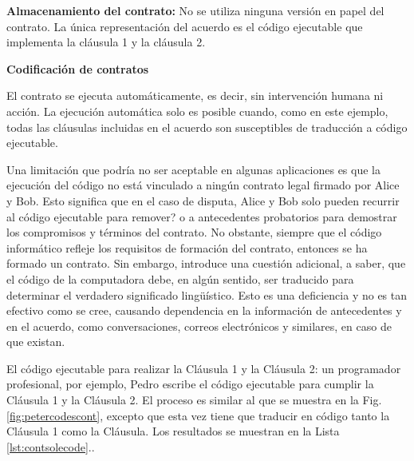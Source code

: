 \documentclass[12pt]{report} %
\begin{document}
\textbf{Almacenamiento del contrato:} No se utiliza ninguna versión en papel del contrato. La única representación del acuerdo es el código ejecutable que implementa la cláusula 1 y la cláusula 2.

\textbf{Codificación de contratos}

El contrato se ejecuta automáticamente, es decir, sin intervención humana ni acción. La ejecución automática solo es posible cuando, como en este ejemplo, todas las cláusulas incluidas en el acuerdo son susceptibles de traducción a código ejecutable.

Una limitación que podría no ser aceptable en algunas aplicaciones es que la ejecución del código no está vinculado a ningún contrato legal firmado por Alice y Bob. Esto significa que en el caso de disputa, Alice y Bob solo pueden recurrir al código ejecutable para remover? o a antecedentes probatorios para demostrar los compromisos y términos del contrato. No obstante, siempre que el código informático refleje los requisitos de formación del contrato, entonces se ha formado un contrato. Sin embargo, introduce una cuestión adicional, a saber, que el código de la computadora debe, en algún sentido, ser traducido para determinar el verdadero significado lingüístico. Esto es una deficiencia y no es tan efectivo como se cree, causando  dependencia en la información de antecedentes y en el acuerdo, como conversaciones, correos electrónicos y similares, en caso de que existan.


El código ejecutable para realizar la Cláusula 1 y la Cláusula 2: un programador profesional, por ejemplo, Pedro escribe el código ejecutable para cumplir la Cláusula 1 y la Cláusula 2. El proceso es similar al que se muestra en la Fig.\ref{fig:petercodescont}, excepto que esta vez tiene que traducir en código tanto la Cláusula 1 como la Cláusula. Los resultados se muestran en la Lista \ref{lst:contsolecode}..
\end{document}
